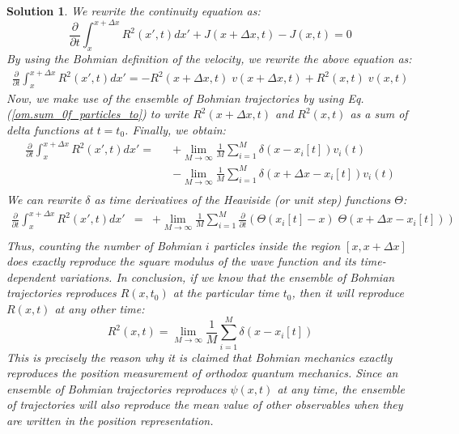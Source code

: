 \documentclass[nofootinbib, secnumarabic, amsmath, nobibnotes,11pt,aps,pra, floatfix]{revtex4-1}
\newtheorem{solution}{Solution}
\newcommand{\eref}[1]{Eq. (\ref{#1})}
\begin{document}
\begin{solution}
We rewrite the continuity equation as:
\begin{equation}
\frac {\partial} {\partial t} \int_{x}^{x + \Delta x} R^2(x',t) dx' + J(x + \Delta x,t) - J(x,t) = 0\nonumber
\label{om.ppre6_1}
\end{equation}
By using the Bohmian definition of the velocity, we rewrite the above equation as:
\begin{eqnarray}
\frac {\partial} {\partial t} \int_{x}^{x + \Delta x} R^2(x',t) dx' = - { R^2(x + \Delta x,t) \; v(x + \Delta x,t) + R^2(x,t) \; v(x,t)}\nonumber
\label{om.ppre6_2}
\end{eqnarray}
Now, we make use of the ensemble of Bohmian trajectories by using
\eref{om.sum_0f_particles_to} to write $R^2(x + \Delta x,t)$ and
$R^2(x,t)$ as a sum of delta functions at $t = t_0$. Finally, we
obtain:
\begin{eqnarray}
\frac {\partial} {\partial t} \int_{x}^{x + \Delta x} R^2(x',t) dx' =
&&+ \lim_{M\rightarrow\infty} \frac {1} {M} \sum_{i = 1}^{M} \delta(x - x_i[t]) v_i(t) \nonumber\\&&-\lim_{M\rightarrow\infty} \frac {1} {M} \sum_{i = 1}^{M} \delta(x + \Delta x - x_i[t]) v_i(t)\nonumber\\
\label{om.ppre6_3}
\end{eqnarray}
We can rewrite $\delta$ as time derivatives of the Heaviside (or
unit step) functions $\Theta$:
\begin{eqnarray}
\frac {\partial} {\partial t} \int_{x}^{x + \Delta x} R^2(x',t) dx' &=&
+ \lim_{M\rightarrow\infty} \frac {1} {M} \sum_{i = 1}^{M} \frac {\partial} {\partial t} \left( \Theta(x_i[t] - x) \; \Theta (x + \Delta x - x_i[t]) \right)\quad\qquad\nonumber\\
\label{om.ppre6_4}
\end{eqnarray}
Thus, counting the number of Bohmian $i$ particles inside the region
$[x,x + \Delta x]$ does exactly reproduce the square modulus of the
wave function and its time-dependent variations. In conclusion, if
we know that the ensemble of Bohmian trajectories reproduces
$R(x,t_0)$ at the particular time $t_0$, then it will reproduce
$R(x,t)$ at any other time:
\begin{equation}
R^2(x,t) = \lim_{M\rightarrow\infty} \frac {1} {M}  \sum_{i = 1}^{M} \delta(x - x_i[t])\nonumber
\end{equation}
This is precisely the reason why it is claimed that Bohmian mechanics exactly reproduces the position measurement of orthodox quantum mechanics. Since an ensemble of Bohmian trajectories reproduces $\psi(x,t)$ at any time, the ensemble of trajectories will also reproduce the mean value of other observables when they are written in the position representation.\\
\end{solution}
\end{document}
